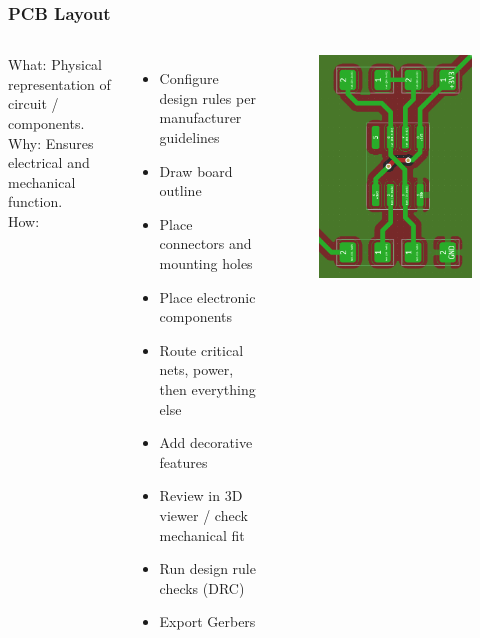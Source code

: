 \documentclass[aspectratio=169, t]{beamer}
\begin{document}
\begin{frame}
\frametitle{PCB Layout}
\begin{columns}
	What: Physical representation of circuit / components.\\
	Why: Ensures electrical and mechanical function.\\
	How:
	\begin{itemize}
		\item Configure design rules per manufacturer guidelines
		\item Draw board outline
		\item Place connectors and mounting holes
		\item Place electronic components
		\item Route critical nets, power, then everything else
		\item Add decorative features
		\item Review in 3D viewer / check mechanical fit
		\item Run design rule checks (DRC)
		\item Export Gerbers
	\end{itemize}
	
	\vspace{-7mm}
	\begin{figure}
		\includegraphics[width=0.8\linewidth]{images/555-layout.png}
	\end{figure}
\end{columns}
\end{frame}
\end{document}
